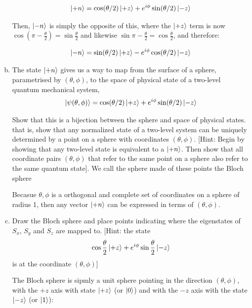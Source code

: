 \documentclass[10pt]{article}
\begin{document}
\begin{enumerate}[(a)]
\begin{solution}
            \[ \ket{+n} = \cos(\theta/2) \ket{+z} + e^{i\phi} \sin(\theta/2) \ket{-z}\] 

            Then, $\ket{-n}$ is simply the opposite of this, where the $\ket{+z}$ term is now $\cos(\pi - \frac{\theta}{2}) = \sin \frac{\theta}{2}$ and likewise $\sin \pi - \frac \theta 2 = \cos \frac \theta 2$, and therefore: 

            \[ \ket{-n} = \sin(\theta/2) \ket{+z} - e^{i\phi}\cos(\theta/2)\ket{-z}\] 
        \end{solution}
        \item The state $\ket{+n}$ gives us a way to map from the surface of a sphere, parametrised by $(\theta, \phi)$, to the space of physical state of a two-level quantum mechanical system, 
        \[ \ket{\psi(\theta, \phi)} = \cos(\theta/2)\ket{+z} + e^{i\phi}\sin(\theta/2)\ket{-z}\] 

        Show that this is a bijection between the sphere and space of physical states. that is, show that any normalized state of a two-level system can be uniquely determined by a point on a sphere with coordinates $(\theta, \phi)$. [Hint: Begin by showing that any two-level state is equivalent to a $\ket{+n}$. Then show that all coordinate pairs $(\theta, \phi)$ that refer to the same point on a sphere also refer to the same quantum state]. We call the sphere made of these points the Bloch sphere

        \begin{solution}
            Becasue $\theta, \phi$ is a orthogonal and complete set of coordinates on a sphere of radius 1, then any vector $\ket{+n}$ can be expressed in terms of $(\theta, \phi)$.
        \end{solution}
        \item Draw the Bloch sphere and place points indicating where the eigenstates of $S_x$, $S_y$ and $S_z$ are mapped to. [Hint: the state
        \[ \cos \frac{\theta}{2} \ket{+z} + e^{i\phi} \sin \frac \theta 2 \ket{-z}\]
        is at the coordinate $(\theta, \phi)$]

        \begin{solution}
            The Bloch sphere is sipmly a unit sphere pointing in the direction $(\theta, \phi)$, with the $+z$ axis with state $\ket{+z}$ (or $\ket 0$) and with the $-z$ axis with the state $\ket{-z}$ (or $\ket 1$):



\end{solution}
\end{enumerate}
\end{document}

